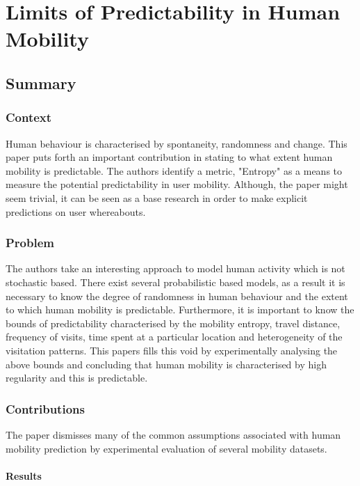 \newpage
\section{Limits of Predictability in Human Mobility\cite{Song1018}} \label{lect2}

\subsection{Summary} \label{lect2-sum}

\subsubsection{Context}

Human behaviour is characterised by spontaneity, randomness and change. This paper puts
forth an important contribution in stating to what extent human mobility is predictable. 
The authors identify a metric, "Entropy" as a means to measure the potential predictability
in user mobility. Although, the paper might seem trivial, it can be seen as a base research
in order to make explicit predictions on user whereabouts. 

\subsubsection{Problem}

The authors take an interesting approach to model human activity which is not stochastic 
based. There exist several probabilistic based models, as a result it is necessary to 
know the degree of randomness in human behaviour and the extent to which human mobility 
is predictable. Furthermore, it is important to know the bounds of predictability 
characterised by the mobility entropy, travel distance, frequency of visits, time spent 
at a particular location and heterogeneity of the visitation patterns. This papers fills this
void by experimentally analysing the above bounds and concluding that human mobility is 
characterised by high regularity and this is predictable.          

\subsubsection{Contributions}

The paper dismisses many of the common assumptions associated with human mobility prediction
by experimental evaluation of several mobility datasets. 

\paragraph{Results}




